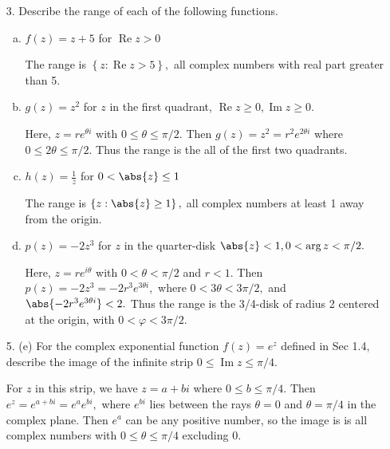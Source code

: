 \documentclass{article}
\DeclareMathOperator{\re}{Re}
\DeclareMathOperator{\im}{Im}
\begin{document}
\begin{itemize}
	\item[3.] Describe the range of each of the following functions.
		\begin{enumerate}[(a)]
			\item $f(z)=z+5$ for $\re z>0$
				\begin{soln}
					The range is $\left\{ z:\re z>5 \right\},$ all complex numbers with real part greater than 5.
				\end{soln}

			\item $g(z)=z^2$ for $z$ in the first quadrant, $\re z\ge 0, \im z\ge 0.$
				\begin{soln}
					Here, $z=re^{\theta i}$ with $0\le \theta\le \pi/2.$ Then $g(z)=z^2=r^2e^{2\theta i}$ where $0\le 2\theta \le \pi/2.$ Thus the range is the all of the first two quadrants.
				\end{soln}

			\item $h(z)=\frac{1}{z}$ for $0<\abs{z}\le 1$
				\begin{soln}
					The range is $\left\{ z:\abs{z}\ge 1 \right\},$ all complex numbers at least 1 away from the origin.
				\end{soln}

			\item $p(z)=-2z^3$ for $z$ in the quarter-disk $\abs{z}<1, 0<\arg z<\pi/2.$
				\begin{soln}
					Here, $z=re^{i\theta}$ with $0<\theta<\pi/2$ and $r<1.$ Then $p(z)=-2z^3=-2r^3 e^{3\theta i},$ where $0<3\theta <3\pi/2,$ and $\abs{-2r^3 e^{3\theta i}}<2.$ Thus the range is the 3/4-disk of radius 2 centered at the origin, with $0<\varphi<3\pi/2.$
				\end{soln}
				
		\end{enumerate}

	\item[5.] (e) For the complex exponential function $f(z)=e^z$ defined in Sec 1.4, describe the image of the infinite strip $0\le \im z\le \pi/4.$
		\begin{soln}
			For $z$ in this strip, we have $z=a+bi$ where $0\le b\le \pi/4.$ Then $e^z=e^{a+bi}=e^a e^{bi},$ where $e^{bi}$ lies between the rays $\theta=0$ and $\theta=\pi/4$ in the complex plane. Then $e^a$ can be any positive number, so the image is is all complex numbers with $0\le \theta\le \pi/4$ excluding 0.
		\end{soln}


\end{itemize}
\end{document}
